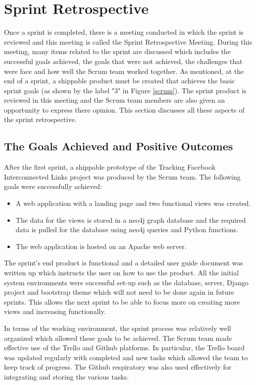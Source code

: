 \documentclass[12pt,onecolumn]{article}
\begin{document}
	\section{Sprint Retrospective} \label{retro}
	Once a sprint is completed, there is a meeting conducted in which the sprint is reviewed and this meeting is called the Sprint Retrospective Meeting. During this meeting, many items related to the sprint are discussed which includes the successful goals achieved, the goals that were not achieved, the challenges that were face and how well the Scrum team worked together. As mentioned, at the end of a sprint, a shippable product must be created that achieves the basic sprint goals (as shown by the label "3" in Figure \ref{scrum}). The sprint product is reviewed in this meeting and the Scrum team members are also given an opportunity to express there opinion. This section discusses all these aspects of the sprint retrospective.
	
	\subsection{The Goals Achieved and Positive Outcomes}
	After the first sprint, a shippable prototype of the Tracking Facebook Interconnected Links project was produced by the Scrum team. The following goals were successfully achieved:
	
	\begin{itemize}
		\item A web application with a landing page and two functional views was created.
		\item The data for the views is stored in a neo4j graph database and the required data is pulled for the database using neo4j queries and Python functions.
		\item The web application is hosted on an Apache web server.
	\end{itemize}
	
	The sprint's end product is functional and a detailed user guide document was written up which instructs the user on how to use the product. All the initial system environments were successful set-up such as the database, server, Django project and bootstrap theme which will not need to be done again in future sprints. This allows the next sprint to be able to focus more on creating more views and increasing functionally. 
	
	In terms of the working environment, the sprint process was relatively well organized which allowed these goals to be achieved. The Scrum team made effective use of the Trello and Github platforms. In particular, the Trello board was updated regularly with completed and new tasks which allowed the team to keep track of progress. The Github respiratory was also used effectively for integrating and storing the various tasks.
	
\end{document}
